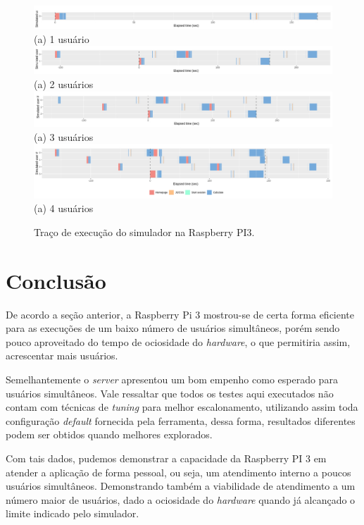 \documentclass[12pt,english,brazil]{article}
\begin{document}
\begin{figure}[htbp]
  \centering 
  \includegraphics[scale=.4]{paperWSCAD2021/figures/user_PI3_1_worker_edit.jpg}\\(a) 1 usuário
 \includegraphics[scale=.4]{paperWSCAD2021/figures/user_PI3_2_worker_edit.jpg}\\(a) 2 usuários
 \includegraphics[scale=.4]{paperWSCAD2021/figures/user_PI3_3_worker_edit.jpg}\\(a) 3 usuários
 \includegraphics[scale=.4]{paperWSCAD2021/figures/user_PI3_4_worker.png}\\(a) 4 usuários
\caption{Traço de execução do simulador na Raspberry PI3.}
  \label{fig:PI3}
\end{figure}

\section{Conclusão} \label{sec:conlusao}
De acordo a seção anterior, a Raspberry Pi 3 mostrou-se de certa forma eficiente para as execuções de um baixo número de usuários simultâneos, porém sendo pouco aproveitado do tempo de ociosidade do \emph{hardware}, o que permitiria assim, acrescentar mais usuários. 

Semelhantemente o \emph{server} apresentou um bom empenho como esperado para usuários simultâneos. Vale ressaltar que todos os testes aqui executados não contam com técnicas de \emph{tuning} para melhor escalonamento, utilizando assim toda configuração \emph{default} fornecida pela ferramenta, dessa forma, resultados diferentes podem ser obtidos quando melhores explorados.

Com tais dados, pudemos demonstrar a capacidade da Raspberry PI 3 em atender a aplicação de forma pessoal, ou seja, um atendimento interno a poucos usuários simultâneos. Demonstrando também a viabilidade de atendimento a um número maior de usuários, dado a ociosidade do \emph{hardware} quando já alcançado o limite indicado pelo simulador.
\end{document}
